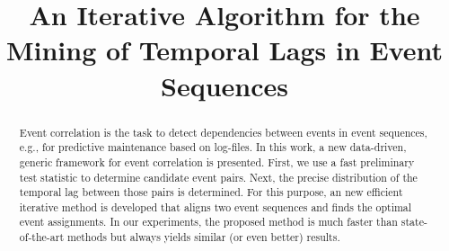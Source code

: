 \documentclass[conference]{IEEEtran}
\theoremstyle{examplestyle}
\begin{document}
\begin{acronym}
\end{acronym}





\title{An Iterative Algorithm for the Mining of  Temporal Lags in Event Sequences}


\author{
\and
{}
}
 



\maketitle


\begin{abstract}
Event correlation is the task to detect dependencies between events in event sequences, e.g., for predictive maintenance based on log-files.
In this work, a new data-driven, generic framework for event correlation is presented. 
First, we use a fast preliminary test statistic to determine candidate event pairs. Next, the precise distribution of the temporal lag between those pairs is determined. 
For this purpose, an new efficient iterative method is developed  that aligns two event sequences and finds the optimal  event assignments.
In our experiments, the proposed method is much faster than state-of-the-art methods but always yields similar (or even better) results. 
\end{abstract}






\IEEEpeerreviewmaketitle
\end{document}
